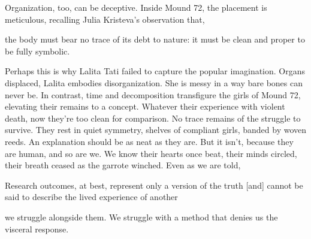 Organization, too, can be deceptive. Inside Mound 72, the placement is meticulous, recalling Julia Kristeva's observation that, \begin{IJSRAquote}{\cite[102]{kristeva1982}}the body must bear no trace of its debt to nature: it must be clean and proper to be fully symbolic.\end{IJSRAquote} Perhaps this is why Lalita Tati failed to capture the popular imagination. Organs displaced, Lalita embodies disorganization. She is messy in a way bare bones can never be. In contrast, time and decomposition transfigure the girls of Mound 72, elevating their remains to a concept. Whatever their experience with violent death, now they're too clean for comparison. No trace remains of the struggle to survive. They rest in quiet symmetry, shelves of compliant girls, banded by woven reeds. An explanation should be as neat as they are. But it isn't, because they are human, and so are we. We know their hearts once beat, their minds circled, their breath ceased as the garrote winched. Even as we are told, \begin{IJSRAquote}{\cite[1153]{hewitt2007}}Research outcomes, at best, represent only a version of the truth [and] cannot be said to describe the lived experience of another\end{IJSRAquote} we struggle alongside them. We struggle with a method that denies us the visceral response. 

\IJSRAclosing%